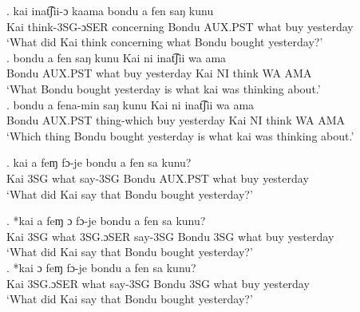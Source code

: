 \documentclass{assets/fieldnotes}
\begin{document}
\exg. kai inat͡ʃii-ɔ kaama bondu a fen saŋ kunu\\
Kai think-3SG-ɔSER concerning Bondu AUX.PST what buy yesterday\\
`What did Kai think concerning what Bondu bought yesterday?' \\

\exg. bondu a fen saŋ kunu Kai ni inat͡ʃii wa ama\\
Bondu AUX.PST what buy yesterday Kai NI think WA AMA\\
`What Bondu bought yesterday is what kai was thinking about.'\\

\exg. bondu a fena-min saŋ kunu Kai ni inat͡ʃii wa ama\\
Bondu AUX.PST thing-which buy yesterday Kai NI think WA AMA\\
`Which thing Bondu bought yesterday is what kai was thinking about.' \\





\exg. kai a feɱ fɔ-je bondu a fen sa kunu?\\
Kai 3SG what say-3SG Bondu AUX.PST what buy yesterday\\
`What did Kai say that Bondu bought yesterday?' \\ 


\exg. *kai a feɱ ɔ fɔ-je bondu a fen sa kunu?\\
Kai 3SG what 3SG.ɔSER say-3SG Bondu 3SG what buy yesterday\\
`What did Kai say that Bondu bought yesterday?' \\ 

\exg. *kai ɔ feɱ fɔ-je bondu a fen sa kunu?\\
Kai 3SG.ɔSER what say-3SG Bondu 3SG what buy yesterday\\
`What did Kai say that Bondu bought yesterday?' \\ 
\end{document}
